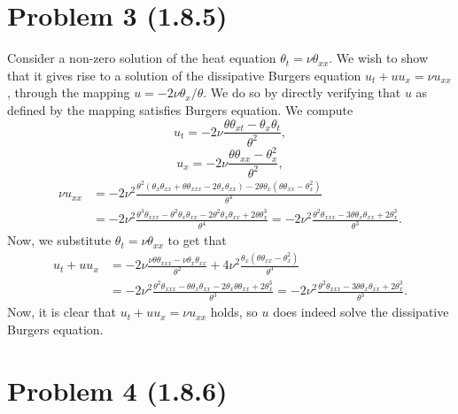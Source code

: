 \documentclass{article}
\begin{document}
\section{Problem 3 (1.8.5)}
Consider a non-zero solution of the heat equation $\theta_t = \nu\theta_{xx}$. We wish to show that it gives rise to a solution of the dissipative Burgers equation $u_t + uu_x = \nu u_{xx}$, through the mapping $u = -2\nu\theta_x/\theta$. We do so by directly verifying that $u$ as defined by the mapping satisfies Burgers equation. We compute
\[
u_t=-2\nu\frac{\theta\theta_{xt}-\theta_x\theta_t}{\theta^2},
\]
\[
u_x=-2\nu\frac{\theta\theta_{xx}-\theta_x^2}{\theta^2},
\]
\begin{align*}
\nu u_{xx}&=-2\nu^2\frac{\theta^2(\theta_x\theta_{xx}+\theta\theta_{xxx}-2\theta_x\theta_{xx})-2\theta\theta_x(\theta\theta_{xx}-\theta_x^2)}{\theta^4}\\&=
-2\nu^2\frac{\theta^3\theta_{xxx}-\theta^2\theta_x\theta_{xx}-2\theta^2\theta_x\theta_{xx}+2\theta\theta_x^3}{\theta^4}=-2\nu^2\frac{\theta^2\theta_{xxx}-3\theta\theta_x\theta_{xx}+2\theta_x^3}{\theta^3}.
\end{align*}
Now, we substitute $\theta_t = \nu\theta_{xx}$ to get that
\begin{align*}
u_t+uu_x&=-2\nu\frac{\nu\theta\theta_{xxx}-\nu\theta_x\theta_{xx}}{\theta^2}+4\nu^2\frac{\theta_x(\theta\theta_{xx}-\theta_x^2)}{\theta^3}\\&=
-2\nu^2\frac{\theta^2\theta_{xxx}-\theta\theta_x\theta_{xx}-2\theta_x\theta\theta_{xx}+2\theta_x^3}{\theta^3}=-2\nu^2\frac{\theta^2\theta_{xxx}-3\theta\theta_x\theta_{xx}+2\theta_x^3}{\theta^3}.
\end{align*}
Now, it is clear that $u_t + uu_x = \nu u_{xx}$ holds, so $u$ does indeed solve the dissipative Burgers equation.

\section{Problem 4 (1.8.6)}
\end{document}
